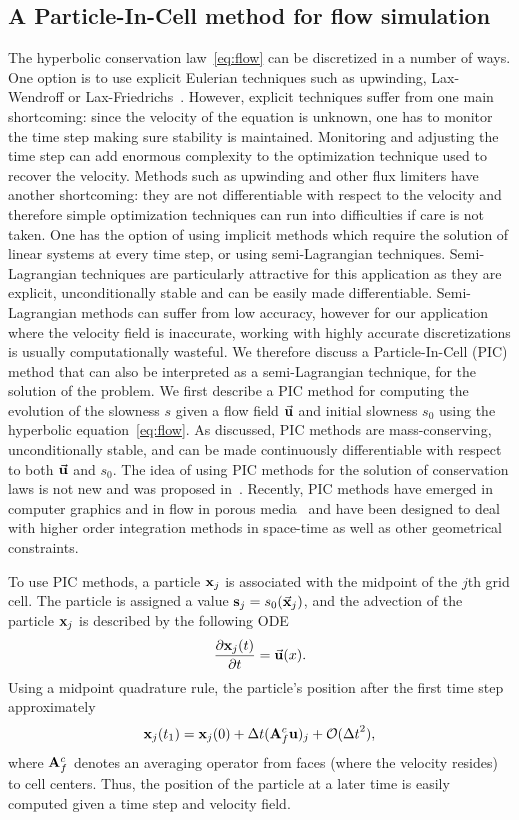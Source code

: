 \documentclass[english]{siamltex}
\newcommand {\bu}   { {\bf u} }          			%
\newcommand {\bfx}  { {\bf x} }
\newcommand {\bfs}   { {\bf s} }
\newcommand {\bfA}  { {\bf A} }
\newcommand {\vu}  { {\vec {\bf  u}} }   %
\newcommand {\vx}    {\vec {\bf x}}
\newcommand {\bx}    {{\bf{x}}}
\begin{document}
\subsection{A Particle-In-Cell method for flow simulation} %
\label{sub:particle-in-cell}
The  hyperbolic conservation law~\eqref{eq:flow} can be discretized in a number of ways. One option is to use explicit Eulerian techniques such as upwinding, Lax-Wendroff or Lax-Friedrichs~\cite{ascher}.
However, explicit techniques  suffer from one main shortcoming: since the velocity of the equation is
unknown, one has to monitor the time step making sure stability is maintained.
Monitoring and adjusting the time step can add enormous complexity to the optimization technique used to recover the velocity.
Methods such as upwinding and other flux limiters have another shortcoming: they are not differentiable
with respect to the velocity and therefore simple optimization techniques can run into difficulties if care
is not taken. One has the option of using implicit methods which require the solution of linear systems at
every time step, or using semi-Lagrangian techniques. Semi-Lagrangian techniques are particularly attractive
for this application as they are explicit, unconditionally stable and can be easily made differentiable.
Semi-Lagrangian methods can suffer from low accuracy, however for our application where the
velocity field is inaccurate, working with highly accurate discretizations is usually computationally 
wasteful. 
We therefore discuss a Particle-In-Cell (PIC) method  that can also be interpreted as a semi-Lagrangian technique, for the solution of the problem.
We first describe a PIC method for computing the evolution of the slowness $s$  given a flow field $\vu$ and initial slowness $s_0$ using the hyperbolic equation~\eqref{eq:flow}. As discussed, PIC methods are mass-conserving,
 unconditionally stable, and can be made continuously differentiable with respect to both $\vu$ and $s_0$. 
The idea of using PIC methods for the solution of conservation laws is not new and was proposed in~\cite{PIC55}. 
Recently, PIC methods have emerged in computer graphics 
\cite{BridsonPIC} and in flow in porous media~\cite{RoubinetDreuzyTartakovsky13}
and have been designed to deal with higher order integration methods in space-time as well as 
other geometrical constraints.

To use PIC methods, a particle $\bfx_j$ is associated with the midpoint of the $j$th grid cell. 
The particle is assigned a value $\bfs_{j} = s_0(\vx_j)$, and the advection of 
the particle $\bfx_j$ is described by the following ODE
\begin{equation}\label{eq:characteristics}
	\frac{\partial\bx_j(t)}{\partial t} = \vu(x).
\end{equation}
Using a midpoint quadrature rule, the particle's position after the first time step approximately 
\begin{equation}
	\bx_j(t_{1}) = \bx_j(0) +  \Delta t (\bfA_{f}^{c} \bu)_j + {\cal O}({\Delta t}^2),
\end{equation}
where $\bfA_{f}^{c}$ denotes an averaging operator from faces (where the velocity resides)
to cell centers.
Thus, the position of the particle at a later time is easily computed given a time step and velocity field. 
\end{document}
